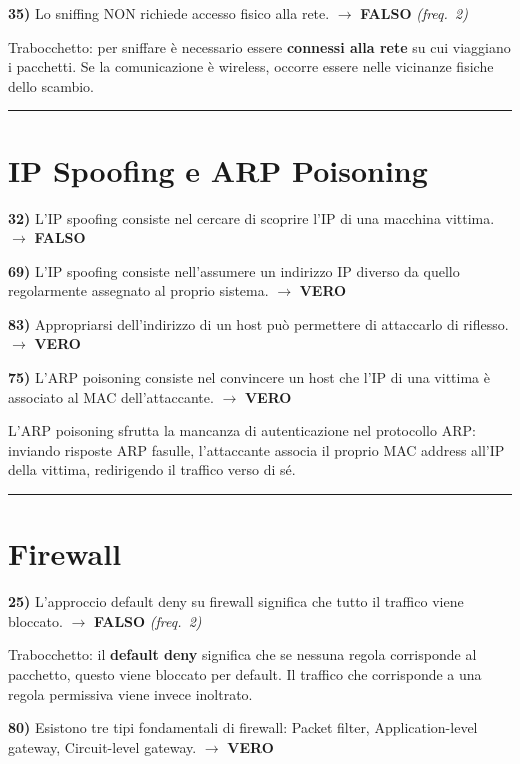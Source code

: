 \documentclass[12pt, a4paper]{report}
\newcommand{\vero}{\textcolor{verdeanswer}{\textbf{VERO}}}
\newcommand{\falso}{\textcolor{rossoanswer}{\textbf{FALSO}}}
\newcommand{\freq}[1]{\textcolor{freqcolor}{\textit{(freq.\ #1)}}}
\begin{document}
\medskip
\noindent\textbf{35)} Lo sniffing NON richiede accesso fisico alla rete. $\to$ \falso{} \freq{2}

\medskip
\noindent Trabocchetto: per sniffare è necessario essere \textbf{connessi alla rete} su cui viaggiano i pacchetti. Se la comunicazione è wireless, occorre essere nelle vicinanze fisiche dello scambio.

\noindent\rule{\textwidth}{0.4pt}

\section{IP Spoofing e ARP Poisoning}

\noindent\textbf{32)} L'IP spoofing consiste nel cercare di scoprire l'IP di una macchina vittima. $\to$ \falso{}

\medskip
\noindent\textbf{69)} L'IP spoofing consiste nell'assumere un indirizzo IP diverso da quello regolarmente assegnato al proprio sistema. $\to$ \vero{}

\medskip
\noindent\textbf{83)} Appropriarsi dell'indirizzo di un host può permettere di attaccarlo di riflesso. $\to$ \vero{}

\medskip
\noindent\textbf{75)} L'ARP poisoning consiste nel convincere un host che l'IP di una vittima è associato al MAC dell'attaccante. $\to$ \vero{}

\medskip
\noindent L'ARP poisoning sfrutta la mancanza di autenticazione nel protocollo ARP: inviando risposte ARP fasulle, l'attaccante associa il proprio MAC address all'IP della vittima, redirigendo il traffico verso di sé.

\noindent\rule{\textwidth}{0.4pt}

\section{Firewall}

\noindent\textbf{25)} L'approccio default deny su firewall significa che tutto il traffico viene bloccato. $\to$ \falso{} \freq{2}

\medskip
\noindent Trabocchetto: il \textbf{default deny} significa che se nessuna regola corrisponde al pacchetto, questo viene bloccato per default. Il traffico che corrisponde a una regola permissiva viene invece inoltrato.

\medskip
\noindent\textbf{80)} Esistono tre tipi fondamentali di firewall: Packet filter, Application-level gateway, Circuit-level gateway. $\to$ \vero{}
\end{document}
